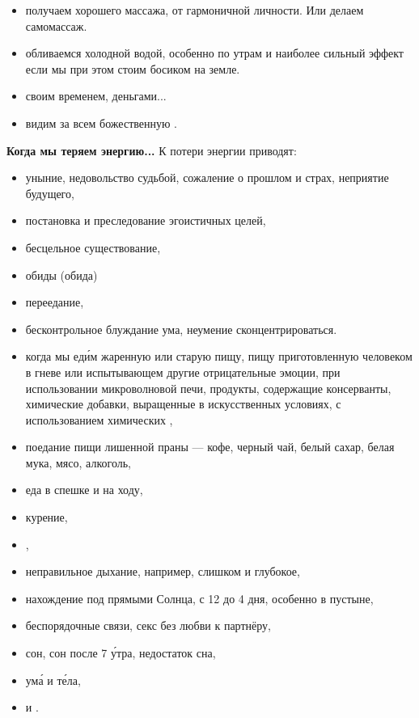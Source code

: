 \begin{enumerate}[noitemsep]
\begin{itemize}[noitemsep, label=+]
              \item получаем  хорошего массажа, от гармоничной личности. Или делаем самомассаж.
              \item обливаемся холодной водой, особенно по утрам и наиболее сильный эффект если мы при этом стоим босиком на земле.
              \item {} своим временем, деньгами...
              \item видим за всем божественную .
          \end{itemize}
\end{enumerate}


\textbf{Когда мы теряем энергию...}
К потери энергии приводят:
\begin{itemize}[noitemsep, label=--]
    \item уныние, недовольство судьбой, сожаление о прошлом и страх, неприятие будущего,
    \item  постановка и преследование эгоистичных целей,
    \item бесцельное существование,
    \item обиды (обида)
    \item переедание,
    \item бесконтрольное блуждание ума, неумение сконцентрироваться.
    \item когда мы ед\'{и}м жаренную или старую пищу, пищу приготовленную человеком в гневе или испытывающем другие отрицательные эмоции, при использовании микроволновой печи, продукты, содержащие консерванты, химические добавки, выращенные в искусственных условиях, с использованием химических ,
    \item поедание пищи лишенной праны --- кофе, черный чай, белый сахар, белая мука, мясо, алкоголь,
    \item еда в спешке и на ходу,
    \item курение,
    \item {},
    \item неправильное дыхание, например, слишком  и глубокое,
    \item нахождение под прямыми  Солнца, с 12 до 4 дня, особенно в пустыне,
    \item беспорядочные  связи, секс без любви к партнёру,
    \item {} сон, сон после 7 \'{у}тра, недостаток сна,
    \item {} ум\'{а} и т\'{е}ла,
    \item {} и .
\end{itemize}

